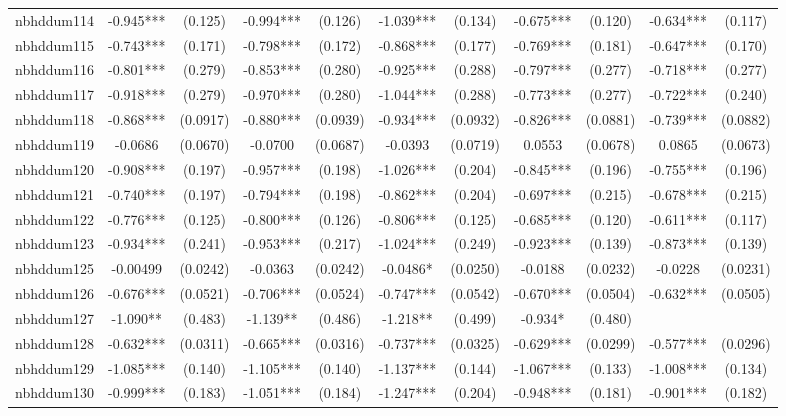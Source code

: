 \documentclass[]{article}
\begin{document}
\begin{tabular}{lcccccccccc}
nbhddum114 & -0.945*** & (0.125) & -0.994*** & (0.126) & -1.039*** & (0.134) & -0.675*** & (0.120) & -0.634*** & (0.117) \\
nbhddum115 & -0.743*** & (0.171) & -0.798*** & (0.172) & -0.868*** & (0.177) & -0.769*** & (0.181) & -0.647*** & (0.170) \\
nbhddum116 & -0.801*** & (0.279) & -0.853*** & (0.280) & -0.925*** & (0.288) & -0.797*** & (0.277) & -0.718*** & (0.277) \\
nbhddum117 & -0.918*** & (0.279) & -0.970*** & (0.280) & -1.044*** & (0.288) & -0.773*** & (0.277) & -0.722*** & (0.240) \\
nbhddum118 & -0.868*** & (0.0917) & -0.880*** & (0.0939) & -0.934*** & (0.0932) & -0.826*** & (0.0881) & -0.739*** & (0.0882) \\
nbhddum119 & -0.0686 & (0.0670) & -0.0700 & (0.0687) & -0.0393 & (0.0719) & 0.0553 & (0.0678) & 0.0865 & (0.0673) \\
nbhddum120 & -0.908*** & (0.197) & -0.957*** & (0.198) & -1.026*** & (0.204) & -0.845*** & (0.196) & -0.755*** & (0.196) \\
nbhddum121 & -0.740*** & (0.197) & -0.794*** & (0.198) & -0.862*** & (0.204) & -0.697*** & (0.215) & -0.678*** & (0.215) \\
nbhddum122 & -0.776*** & (0.125) & -0.800*** & (0.126) & -0.806*** & (0.125) & -0.685*** & (0.120) & -0.611*** & (0.117) \\
nbhddum123 & -0.934*** & (0.241) & -0.953*** & (0.217) & -1.024*** & (0.249) & -0.923*** & (0.139) & -0.873*** & (0.139) \\
nbhddum125 & -0.00499 & (0.0242) & -0.0363 & (0.0242) & -0.0486* & (0.0250) & -0.0188 & (0.0232) & -0.0228 & (0.0231) \\
nbhddum126 & -0.676*** & (0.0521) & -0.706*** & (0.0524) & -0.747*** & (0.0542) & -0.670*** & (0.0504) & -0.632*** & (0.0505) \\
nbhddum127 & -1.090** & (0.483) & -1.139** & (0.486) & -1.218** & (0.499) & -0.934* & (0.480) &  &  \\
nbhddum128 & -0.632*** & (0.0311) & -0.665*** & (0.0316) & -0.737*** & (0.0325) & -0.629*** & (0.0299) & -0.577*** & (0.0296) \\
nbhddum129 & -1.085*** & (0.140) & -1.105*** & (0.140) & -1.137*** & (0.144) & -1.067*** & (0.133) & -1.008*** & (0.134) \\
nbhddum130 & -0.999*** & (0.183) & -1.051*** & (0.184) & -1.247*** & (0.204) & -0.948*** & (0.181) & -0.901*** & (0.182) \\

\end{tabular}
\end{document}
